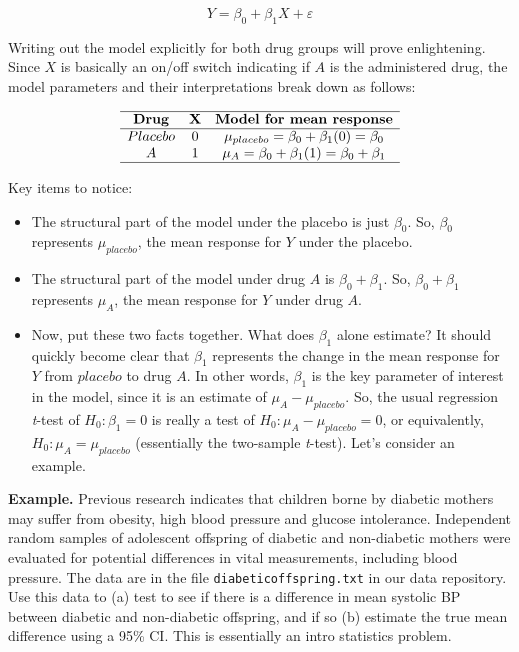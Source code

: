 \documentclass[
]{book}
\providecommand{\tightlist}{%
  \setlength{\itemsep}{0pt}\setlength{\parskip}{0pt}}
\begin{document}
\[Y = \beta_0 + \beta_1 X + \varepsilon\]

Writing out the model explicitly for both drug groups will prove enlightening. Since \(X\) is basically an on/off switch indicating if \(A\) is the administered drug, the model parameters and their interpretations break down as follows:

\[\begin{array}{ccc}
\hline
\textbf{Drug} & \mathbf{X} & \textbf{Model for mean response} \\
\hline
Placebo & 0 & \mu_{placebo} =  \beta_0 + \beta_1(0) = \beta_0 \\
A & 1 & \mu_A = \beta_0 + \beta_1(1) = \beta_0 + \beta_1 \\
\hline
\end{array}\]

Key items to notice:

\begin{itemize}
\tightlist
\item
  The structural part of the model under the placebo is just \(\beta_0\). So, \(\beta_0\) represents \(\mu_{placebo}\), the mean response for \(Y\) under the placebo.
\item
  The structural part of the model under drug \(A\) is \(\beta_0 + \beta_1\). So, \(\beta_0 + \beta_1\) represents \(\mu_A\), the mean response for \(Y\) under drug \(A\).
\item
  Now, put these two facts together. What does \(\beta_1\) alone estimate? It should quickly become clear that \(\beta_1\) represents the change in the mean response for \(Y\) from \(placebo\) to drug \(A\). In other words, \(\beta_1\) is the key parameter of interest in the model, since it is an estimate of \(\mu_A - \mu_{placebo}\). So, the usual regression \emph{t}-test of \(H_0: \beta_1 = 0\) is really a test of \(H_0: \mu_A - \mu_{placebo} = 0\), or equivalently, \(H_0: \mu_A = \mu_{placebo}\) (essentially the two-sample \emph{t}-test). Let's consider an example.
\end{itemize}

\textbf{Example.} Previous research indicates that children borne by diabetic mothers may suffer from obesity, high blood pressure and glucose intolerance. Independent random samples of adolescent offspring of diabetic and non-diabetic mothers were evaluated for potential differences in vital measurements, including blood pressure. The data are in the file \texttt{diabeticoffspring.txt} in our data repository. Use this data to (a) test to see if there is a difference in mean systolic BP between diabetic and non-diabetic offspring, and if so (b) estimate the true mean difference using a 95\% CI. This is essentially an intro statistics problem.
\end{document}
